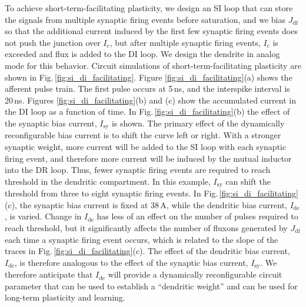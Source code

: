 \documentclass[twocolumn]{article}
\begin{document}
To achieve short-term-facilitating plasticity, we design an SI loop that can store the signals from multiple synaptic firing events before saturation, and we bias $J_{\mathrm{df}}$ so that the additional current induced by the first few synaptic firing events does not push the junction over $I_{\mathrm{c}}$, but after multiple synaptic firing events, $I_{\mathrm{c}}$ is exceeded and flux is added to the DI loop. We design the dendrite in analog mode for this behavior. Circuit simulations of short-term-facilitating plasticity are shown in Fig.\,\ref{fig:si_di_facilitating}. Figure \ref{fig:si_di_facilitating}(a) shows the afferent pulse train. The first pulse occurs at 5\,ns, and the interspike interval is 20\,ns. Figures \ref{fig:si_di_facilitating}(b) and (c) show the accumulated current in the DI loop as a function of time. In Fig.\,\ref{fig:si_di_facilitating}(b) the effect of the synaptic bias current, $I_{\mathrm{sy}}$ is shown. The primary effect of the dynamically reconfigurable bias current is to shift the curve left or right. With a stronger synaptic weight, more current will be added to the SI loop with each synaptic firing event, and therefore more current will be induced by the mutual inductor into the DR loop. Thus, fewer synaptic firing events are required to reach threshold in the dendritic compartment. In this example, $I_{\mathrm{sy}}$ can shift the threshold from three to eight synaptic firing events. In Fig.\,\ref{fig:si_di_facilitating}(c), the synaptic bias current is fixed at 38\,\textmu A, while the dendritic bias current, $I_{\mathrm{de}}$, is varied. Change in $I_{\mathrm{de}}$ has less of an effect on the number of pulses required to reach threshold, but it significantly affects the number of fluxons generated by $J_{\mathrm{df}}$ each time a synaptic firing event occurs, which is related to the slope of the traces in Fig.\,\ref{fig:si_di_facilitating}(c). The effect of the dendritic bias current, $I_{\mathrm{de}}$, is therefore analogous to the effect of the synaptic bias current, $I_{\mathrm{sy}}$. We therefore anticipate that $I_{\mathrm{de}}$ will provide a dynamically reconfigurable circuit parameter that can be used to establish a ``dendritic weight'' and can be used for long-term plasticity and learning. 
\end{document}
